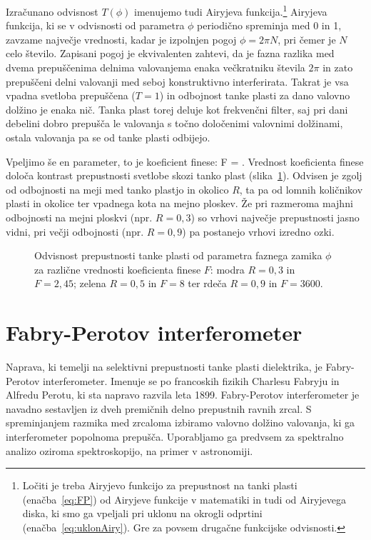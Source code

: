 Izračunano odvisnost $T(\phi)$ imenujemo tudi Airyjeva
funkcija.\footnote{Ločiti je treba Airyjevo funkcijo za prepustnost 
na tanki plasti (enačba~\ref{eq:FP}) od Airyjeve funkcije v matematiki in tudi 
od Airyjevega diska, ki smo ga vpeljali pri uklonu na okrogli odprtini 
(enačba~\ref{eq:uklonAiry}). Gre za povsem drugačne funkcijske odvisnosti.}
Airyjeva funkcija, ki se v odvisnosti od parametra $\phi$ periodično spreminja
med 0 in 1, zavzame največje vrednosti, kadar je izpolnjen pogoj $\phi = 2 \pi N$, 
pri čemer je $N$ celo število. Zapisani pogoj je ekvivalenten zahtevi, da je  
fazna razlika med dvema prepuščenima delnima valovanjema enaka večkratniku 
števila $2\pi$ in zato prepuščeni delni valovanji med seboj konstruktivno 
interferirata. Takrat je vsa vpadna svetloba prepuščena ($T=1$) in 
odbojnost tanke plasti za dano valovno dolžino je enaka nič. Tanka plast torej 
deluje kot frekvenčni filter, saj pri dani debelini dobro prepušča le valovanja
s točno določenimi valovnimi dolžinami, ostala valovanja pa se od tanke plasti 
odbijejo.

Vpeljimo še en parameter, to je koeficient finese:
\beq
F = .
\label{eq:06_44}
\eeq
Vrednost koeficienta finese določa kontrast prepustnosti svetlobe skozi tanko
plast (slika~\ref{fig:06_FP1}). Odvisen je zgolj od odbojnosti na meji
med tanko plastjo in okolico $R$, ta pa od lomnih količnikov plasti in okolice
ter vpadnega kota na mejno ploskev. Že pri razmeroma majhni odbojnosti na mejni
ploskvi (npr. $R=0,3$) so vrhovi največje prepustnosti jasno vidni, pri večji 
odbojnosti (npr. $R=0,9$) pa postanejo vrhovi izredno ozki.
\begin{figure}[ht]
\centering
\def\svgwidth{110truemm} 

\caption{Odvisnost prepustnosti tanke plasti od parametra faznega zamika $\phi$
za različne vrednosti koeficienta finese $F$: modra $R = 0,3$ in $F=2,45$; 
zelena $R=0,5$ in $F=8$ ter rdeča $R=0,9$ in $F=3600$.}
\label{fig:06_FP1}
\end{figure}

\section{Fabry-Perotov interferometer}
Naprava, ki temelji na selektivni prepustnosti tanke plasti dielektrika, je 
Fabry-Perotov interferometer. Imenuje se po francoskih fizikih Charlesu Fabryju
in Alfredu Perotu, ki sta napravo razvila leta 1899. Fabry-Perotov interferometer
je navadno sestavljen iz dveh premičnih delno prepustnih ravnih zrcal. S
spreminjanjem razmika med zrcaloma izbiramo valovno dolžino
valovanja, ki ga interferometer popolnoma prepušča. Uporabljamo ga predvsem
za spektralno analizo oziroma spektroskopijo, na primer v astronomiji. 

